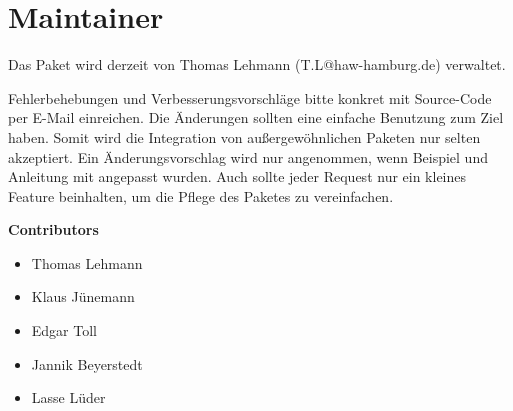 %
\section{Maintainer}\label{sec:maintainer}
Das Paket wird derzeit von Thomas Lehmann (T.L@haw-hamburg.de) verwaltet.

Fehlerbehebungen und Verbesserungsvorschläge bitte konkret mit Source-Code per E-Mail einreichen. Die Änderungen sollten eine einfache Benutzung zum Ziel haben. Somit wird die Integration von außergewöhnlichen Paketen nur selten akzeptiert. Ein Änderungsvorschlag wird nur angenommen, wenn Beispiel und Anleitung mit angepasst wurden. Auch sollte jeder Request nur ein kleines Feature beinhalten, um die Pflege des Paketes zu vereinfachen.

\textbf{Contributors}
\begin{itemize}
\item Thomas Lehmann
\item Klaus Jünemann
\item Edgar Toll
\item Jannik Beyerstedt
\item Lasse Lüder
\end{itemize}
